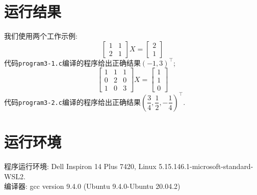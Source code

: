 \documentclass{article}
\begin{document}
\section{运行结果}
我们使用两个工作示例:
\[\begin{bmatrix}
    1 & 1 \\
    2 & 1
\end{bmatrix}X=\begin{bmatrix}
    2 \\ 1
\end{bmatrix}\]
代码\verb|program3-1.c|编译的程序给出正确结果$(-1,3)^\top$;
\[\begin{bmatrix}
    1 & 1 & 1 \\
    0 & 2 & 0 \\
    1 & 0 & 3
\end{bmatrix}X=\begin{bmatrix}
    1 \\ 1 \\ 0
\end{bmatrix}\]
代码\verb|program3-2.c|编译的程序给出正确结果$\left(\dfrac{3}{4},\dfrac{1}{2},-\dfrac{1}{4}\right)^\top$.

\section{运行环境}
\noindent 程序运行环境: Dell Inspiron 14 Plus 7420, Linux 5.15.146.1-microsoft-standard-WSL2.\\
编译器: gcc version 9.4.0 (Ubuntu 9.4.0-Ubuntu 20.04.2)
\end{document}
